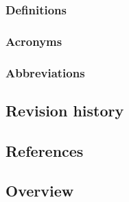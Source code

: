 \subsubsection{Definitions}
\subsubsection{Acronyms}
\subsubsection{Abbreviations}
\subsection{Revision history}
\subsection{References}
\subsection{Overview}